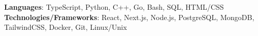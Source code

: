 \begin{itemize}[leftmargin=0.15in, label={}]
  \small{\item{
   \textbf{Languages}{: TypeScript, Python, C++, Go, Bash, SQL, HTML/CSS} \\
   \textbf{Technologies/Frameworks}{: React, Next.js, Node.js, PostgreSQL, MongoDB, TailwindCSS, Docker, Git, Linux/Unix}
  }}
\end{itemize}